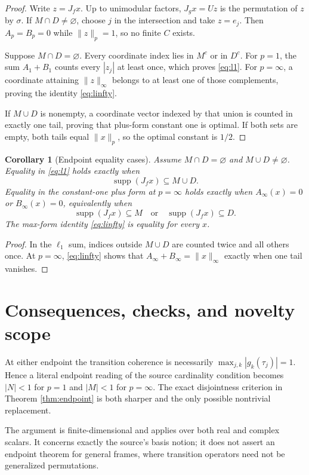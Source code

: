 \documentclass[11pt]{article}
\newtheorem{corollary}{Corollary}
\newcommand{\supp}{\operatorname{supp}}
\begin{document}
\begin{proof}
Write $z=J_fx$.  Up to unimodular factors, $J_gx=Uz$ is the permutation of
$z$ by $\sigma$.  If $M\cap D\ne\varnothing$, choose $j$ in the intersection
and take $z=e_j$.  Then $A_p=B_p=0$ while $\|z\|_p=1$, so no finite $C$
exists.

Suppose $M\cap D=\varnothing$.  Every coordinate index lies in $M^c$ or in
$D^c$.  For $p=1$, the sum $A_1+B_1$ counts every $|z_j|$ at least once,
which proves \eqref{eq:l1}.  For $p=\infty$, a coordinate attaining
$\|z\|_\infty$ belongs to at least one of those complements, proving the
identity \eqref{eq:linfty}.

If $M\cup D$ is nonempty, a coordinate vector indexed by that union is
counted in exactly one tail, proving that plus-form constant one is optimal.
If both sets are empty, both tails equal $\|x\|_p$, so the optimal constant is
$1/2$.
\end{proof}

\begin{corollary}[Endpoint equality cases]
Assume $M\cap D=\varnothing$ and $M\cup D\ne\varnothing$.
Equality in \eqref{eq:l1} holds exactly when
\[
 \supp(J_fx)\subseteq M\cup D.
\]
Equality in the constant-one plus form at $p=\infty$ holds exactly when
$A_\infty(x)=0$ or $B_\infty(x)=0$, equivalently when
\[
 \supp(J_fx)\subseteq M\quad\text{or}\quad \supp(J_fx)\subseteq D.
\]
The max-form identity \eqref{eq:linfty} is equality for every $x$.
\end{corollary}

\begin{proof}
In the $\ell_1$ sum, indices outside $M\cup D$ are counted twice and all
others once.  At $p=\infty$, \eqref{eq:linfty} shows that
$A_\infty+B_\infty=\|x\|_\infty$ exactly when one tail vanishes.
\end{proof}

\section{Consequences, checks, and novelty scope}

At either endpoint the transition coherence is necessarily
$\max_{j,k}|g_k(\tau_j)|=1$.  Hence a literal endpoint reading of the source
cardinality condition becomes $|N|<1$ for $p=1$ and $|M|<1$ for
$p=\infty$.  The exact disjointness criterion in Theorem \ref{thm:endpoint}
is both sharper and the only possible nontrivial replacement.

The argument is finite-dimensional and applies over both real and complex
scalars.  It concerns exactly the source's basis notion; it does not assert an
endpoint theorem for general frames, where transition operators need not be
generalized permutations.
\end{document}
